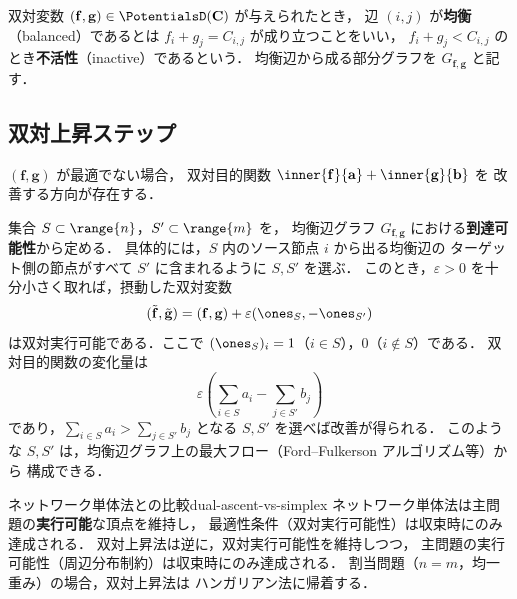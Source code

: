 双対変数 $(\mathbf{f}, \mathbf{g}) \in \PotentialsD(\mathbf{C})$ が与えられたとき，
辺 $(i, j)$ が\textbf{均衡}（balanced）であるとは $f_i + g_j = C_{i,j}$ が成り立つことをいい，
$f_i + g_j < C_{i,j}$ のとき\textbf{不活性}（inactive）であるという．
均衡辺から成る部分グラフを $G_{\mathbf{f}, \mathbf{g}}$ と記す．

\subsection{双対上昇ステップ}

$(\mathbf{f}, \mathbf{g})$ が最適でない場合，
双対目的関数 $\inner{\mathbf{f}}{\mathbf{a}} + \inner{\mathbf{g}}{\mathbf{b}}$ を
改善する方向が存在する．

集合 $S \subset \range{n}$，$S' \subset \range{m}$ を，
均衡辺グラフ $G_{\mathbf{f}, \mathbf{g}}$ における\textbf{到達可能性}から定める．
具体的には，$S$ 内のソース節点 $i$ から出る均衡辺の
ターゲット側の節点がすべて $S'$ に含まれるように $S, S'$ を選ぶ．
このとき，$\varepsilon > 0$ を十分小さく取れば，摂動した双対変数
\[
  (\tilde{\mathbf{f}}, \tilde{\mathbf{g}})
  = (\mathbf{f}, \mathbf{g})
  + \varepsilon(\ones_S, -\ones_{S'})
\]
は双対実行可能である．ここで $(\ones_S)_i = 1$（$i \in S$），$0$（$i \notin S$）である．
双対目的関数の変化量は
\[
  \varepsilon \left( \sum_{i \in S} a_i - \sum_{j \in S'} b_j \right)
\]
であり，$\sum_{i \in S} a_i > \sum_{j \in S'} b_j$ となる $S, S'$ を選べば改善が得られる．
このような $S, S'$ は，均衡辺グラフ上の最大フロー（Ford--Fulkerson アルゴリズム等）から
構成できる．

\begin{remark}{ネットワーク単体法との比較}{dual-ascent-vs-simplex}
  ネットワーク単体法は主問題の\textbf{実行可能}な頂点を維持し，
  最適性条件（双対実行可能性）は収束時にのみ達成される．
  双対上昇法は逆に，双対実行可能性を維持しつつ，
  主問題の実行可能性（周辺分布制約）は収束時にのみ達成される．
  割当問題（$n = m$，均一重み）の場合，双対上昇法は
  ハンガリアン法に帰着する．
\end{remark}
